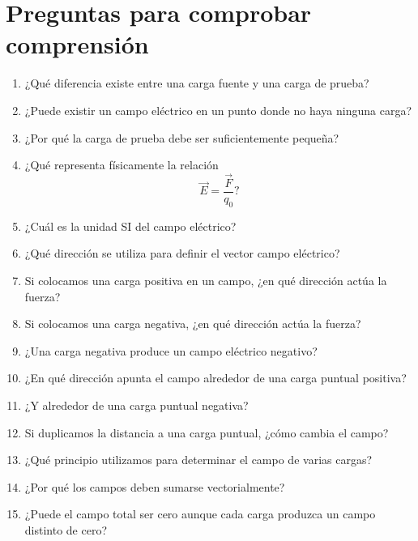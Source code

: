 \section{Preguntas para comprobar comprensión}

\begin{enumerate}
    \item ¿Qué diferencia existe entre una carga fuente y una carga de prueba?

    \item ¿Puede existir un campo eléctrico en un punto donde no haya ninguna carga?

    \item ¿Por qué la carga de prueba debe ser suficientemente pequeña?

    \item ¿Qué representa físicamente la relación
    \[
    \vec E=\frac{\vec F}{q_0}?
    \]

    \item ¿Cuál es la unidad SI del campo eléctrico?

    \item ¿Qué dirección se utiliza para definir el vector campo eléctrico?

    \item Si colocamos una carga positiva en un campo, ¿en qué dirección actúa la
    fuerza?

    \item Si colocamos una carga negativa, ¿en qué dirección actúa la fuerza?

    \item ¿Una carga negativa produce un campo eléctrico negativo?

    \item ¿En qué dirección apunta el campo alrededor de una carga puntual positiva?

    \item ¿Y alrededor de una carga puntual negativa?

    \item Si duplicamos la distancia a una carga puntual, ¿cómo cambia el campo?

    \item ¿Qué principio utilizamos para determinar el campo de varias cargas?

    \item ¿Por qué los campos deben sumarse vectorialmente?

    \item ¿Puede el campo total ser cero aunque cada carga produzca un campo distinto
    de cero?


\end{enumerate}
